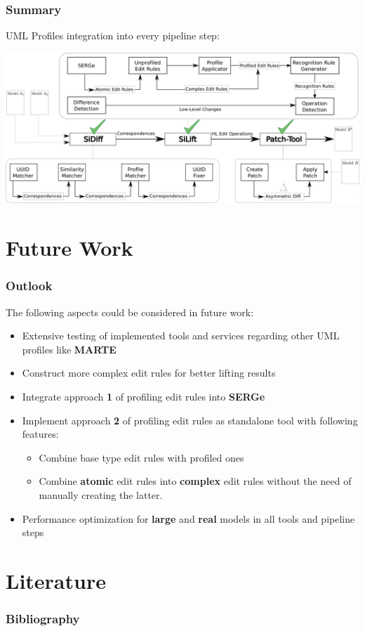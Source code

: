\documentclass[10pt]{beamer}
\begin{document}
\begin{frame}
\frametitle{Summary}
UML Profiles integration into every pipeline step:
\begin{center}
\includegraphics[scale=0.375]{integration_overview_ready_p6}\\
\end{center}
\end{frame}
\section{Future Work}
\begin{frame}
\frametitle{Outlook}
The following aspects could be considered in future work:
\begin{itemize}
  \item Extensive testing of implemented tools and services regarding other
  UML profiles like \textbf{MARTE}
  \item Construct more complex edit rules for better lifting results 
  \item Integrate approach \textbf{1} of profiling edit rules into
  \textbf{SERGe}
  \item Implement approach \textbf{2} of profiling edit rules as standalone tool
	with following features:
	\begin{itemize}
	  \item Combine base type edit rules with profiled ones
	  \item Combine \textbf{atomic} edit rules into \textbf{complex} edit rules
	  		without the need of manually creating the latter.
	 \end{itemize}
	\item Performance optimization for \textbf{large} and \textbf{real} models in
	all tools and pipeline steps
\end{itemize}
\end{frame}
\section{Literature}
\begin{frame}
\frametitle{Bibliography}


\end{frame}
\end{document}
